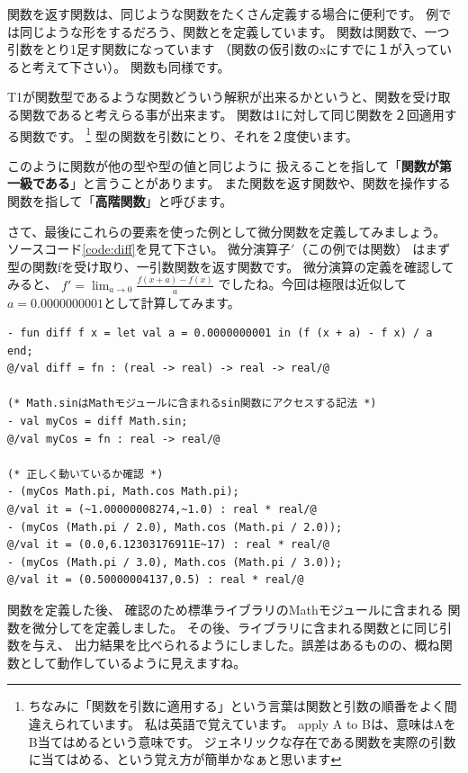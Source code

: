 \documentclass[11pt,a4paper]{article}
\begin{document}
関数を返す関数は、同じような関数をたくさん定義する場合に便利です。
例では同じような形をするだろう、関数とを定義しています。
関数は関数で、一つ引数をとり1足す関数になっています
（関数の仮引数のxにすでに１が入っていると考えて下さい）。
関数も同様です。

T1が関数型であるような関数どういう解釈が出来るかというと、関数を受け取る関数であると考えらる事が出来ます。
関数は1に対して同じ関数を２回適用する関数です。
\footnote{
ちなみに「関数を引数に適用する」という言葉は関数と引数の順番をよく間違えられています。
私は英語で覚えています。
apply A to Bは、意味はAをB当てはめるという意味です。
ジェネリックな存在である関数を実際の引数に当てはめる、という覚え方が簡単かなぁと思います}
型の関数を引数にとり、それを２度使います。

このように関数が他の型や型の値と同じように
扱えることを指して「{\bfseries 関数が第一級である}」と言うことがあります。
また関数を返す関数や、関数を操作する関数を指して「{\bfseries 高階関数}」と呼びます。

さて、最後にこれらの要素を使った例として微分関数を定義してみましょう。
ソースコード\ref{code:diff}を見て下さい。
微分演算子$'$（この例では関数）
はまず型の関数fを受け取り、一引数関数を返す関数です。
微分演算の定義を確認してみると、
$f' = \lim_{a \to 0}\frac{f(x+a) - f(x)}{a}$
でしたね。今回は極限は近似して$a = 0.0000000001$として計算してみます。

\begin{lstlisting}[caption=高階関数の例,label=code:diff]
- fun diff f x = let val a = 0.0000000001 in (f (x + a) - f x) / a end;
@/val diff = fn : (real -> real) -> real -> real/@

(* Math.sinはMathモジュールに含まれるsin関数にアクセスする記法 *)
- val myCos = diff Math.sin;
@/val myCos = fn : real -> real/@

(* 正しく動いているか確認 *)
- (myCos Math.pi, Math.cos Math.pi);
@/val it = (~1.00000008274,~1.0) : real * real/@
- (myCos (Math.pi / 2.0), Math.cos (Math.pi / 2.0));
@/val it = (0.0,6.12303176911E~17) : real * real/@
- (myCos (Math.pi / 3.0), Math.cos (Math.pi / 3.0));
@/val it = (0.50000004137,0.5) : real * real/@
\end{lstlisting}

関数を定義した後、
確認のため標準ライブラリのMathモジュールに含まれる
関数を微分してを定義しました。
その後、ライブラリに含まれる関数とに同じ引数を与え、
出力結果を比べられるようにしました。誤差はあるものの、概ね関数として動作しているように見えますね。
\end{document}
